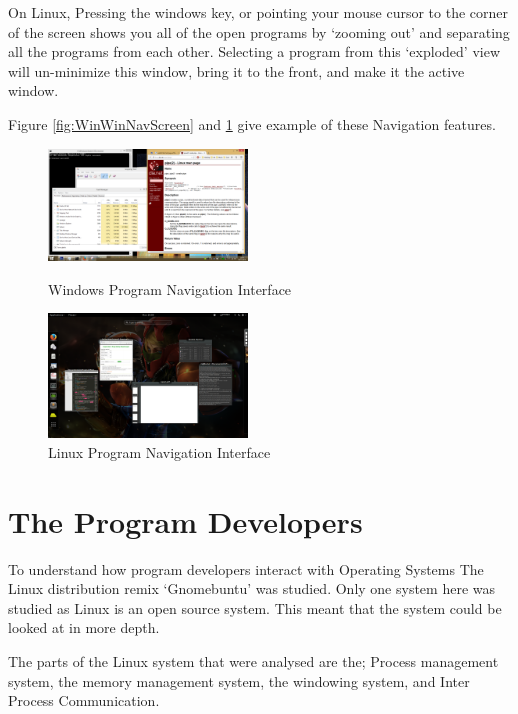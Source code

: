 \documentclass[a4paper]{report}
\begin{document}
On Linux, Pressing the windows key, or pointing your mouse cursor to the corner of the screen shows you all of the open programs by `zooming out' and separating all the programs from each other. Selecting a program from this `exploded' view will un-minimize this window, bring it to the front, and make it the active window.

Figure \ref{fig:WinWinNavScreen} and \ref{fig:LinWinNavScreen} give example of these Navigation features.

\begin{figure}[ht]
\centering
\begin{minipage}{.5\textwidth}
  \centering
  \includegraphics[width=200px]{images/Windows_Window_Navigation_Screenshot}
  \caption{Windows Program Navigation Interface}
  \label{fig:WinWinNavScreen}
\end{minipage}%
\begin{minipage}{.5\textwidth}
  \centering
  \includegraphics[width=200px]{images/Linux_Window_Navigation_Screenshot}
  \caption{Linux Program Navigation Interface}
  \label{fig:LinWinNavScreen}
\end{minipage}
\end{figure}


\clearpage
\section{The Program Developers}

To understand how program developers interact with Operating Systems The Linux distribution remix `Gnomebuntu' was studied. Only one system here was studied as Linux is an open source system. This meant that the system could be looked at in more depth.

The parts of the Linux system that were analysed are the; Process management system, the memory management system, the windowing system, and Inter Process Communication.
\end{document}
